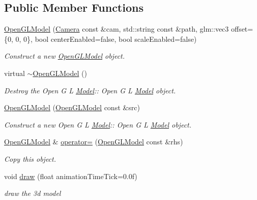 \subsection*{Public Member Functions}
\begin{DoxyCompactItemize}
\item 
\hyperlink{class_open_g_l_model_a5cd104e3a2b45f37809bc8cc80444cff}{Open\+G\+L\+Model} (\hyperlink{class_camera}{Camera} const \&cam, std\+::string const \&path, glm\+::vec3 offset=\{0, 0, 0\}, bool center\+Enabled=false, bool scale\+Enabled=false)
\begin{DoxyCompactList}\small\item\em Construct a new \hyperlink{class_open_g_l_model}{Open\+G\+L\+Model} object. \end{DoxyCompactList}\item 
\mbox{\label{class_open_g_l_model_a9e2759febf44fab8bbafcbc585f3d170}} 
virtual \hyperlink{class_open_g_l_model_a9e2759febf44fab8bbafcbc585f3d170}{$\sim$\+Open\+G\+L\+Model} ()
\begin{DoxyCompactList}\small\item\em Destroy the Open G L \hyperlink{class_model}{Model}\+:\+: Open G L \hyperlink{class_model}{Model} object. \end{DoxyCompactList}\item 
\hyperlink{class_open_g_l_model_a6272c866ecede91558796688e8166c04}{Open\+G\+L\+Model} (\hyperlink{class_open_g_l_model}{Open\+G\+L\+Model} const \&src)
\begin{DoxyCompactList}\small\item\em Construct a new Open G L \hyperlink{class_model}{Model}\+:\+: Open G L \hyperlink{class_model}{Model} object. \end{DoxyCompactList}\item 
\hyperlink{class_open_g_l_model}{Open\+G\+L\+Model} \& \hyperlink{class_open_g_l_model_a5a1d89d46e6cf8dd40f4c66058575a1e}{operator=} (\hyperlink{class_open_g_l_model}{Open\+G\+L\+Model} const \&rhs)
\begin{DoxyCompactList}\small\item\em Copy this object. \end{DoxyCompactList}\item 
void \hyperlink{class_open_g_l_model_a4bd3e8f7769c665276083f0a2d038cba}{draw} (float animation\+Time\+Tick=0.\+0f)
\begin{DoxyCompactList}\small\item\em draw the 3d model \end{DoxyCompactList}\item 

\end{DoxyCompactItemize}
